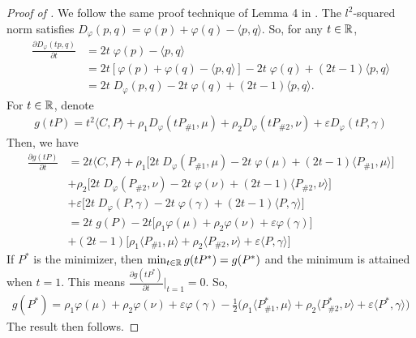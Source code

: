 \begin{proof}[Proof of ]
We follow the same proof technique of Lemma 4 in \citep{Khiem20}. The $l^2$-squared norm satisfies
$D_{\varphi}(p, q) = \varphi(p) + \varphi(q) - \langle p, q \rangle$. So, for any $t \in \mathbb R$,
\begin{align}
  \frac{\partial D_{\varphi}(tp, q)}{\partial t}
  &= 2 t \; \varphi(p) - \langle p, q \rangle \\
  &= 2t \left[ \varphi(p) + \varphi(q) - \langle p, q \rangle \right]
  - 2t \; \varphi(q) + (2t-1) \langle p, q \rangle \\
  &= 2t \; D_{\varphi}(p, q) - 2t \; \varphi(q) + (2t - 1) \langle p, q \rangle.
\end{align}
For $t \in \mathbb R$, denote
\begin{align}
  g(tP) = t^2 \langle C, P \rangle + \rho_1 D_{\varphi}(t P_{\# 1}, \mu) +
  \rho_2 D_{\varphi}(t P_{\# 2}, \nu) + \varepsilon D_{\varphi}(t P, \gamma)
\end{align}
Then, we have
\begin{align}
  \frac{\partial g(tP)}{\partial t} &= 2t \langle C, P \rangle
  + \rho_1 \Big[ 2t \; D_{\varphi}(P_{\# 1}, \mu) - 2t \; \varphi(\mu)
  + (2t - 1) \langle P_{\# 1}, \mu \rangle \Big] \\
  &+ \rho_2 \Big[ 2t \; D_{\varphi}(P_{\# 2}, \nu) - 2t \; \varphi(\nu)
  + (2t - 1) \langle P_{\# 2}, \nu \rangle \Big] \\
  &+ \varepsilon \Big[ 2t \; D_{\varphi}(P, \gamma) - 2t \; \varphi(\gamma)
  + (2t - 1) \langle P, \gamma \rangle \Big] \\
  &= 2t \; g(P) - 2t \Big[ \rho_1 \varphi(\mu)
  + \rho_2 \varphi(\nu) + \varepsilon \varphi(\gamma) \Big] \\
  &+ (2t - 1) \Big[ \rho_1 \langle P_{\# 1}, \mu \rangle
  + \rho_2 \langle P_{\# 2}, \nu \rangle + \varepsilon \langle P, \gamma \rangle \Big]
\end{align}
If $P^*$ is the minimizer, then $\min_{t \in \mathbb R} g(tP^*) = g(P^*)$ and the minimum is attained
when $t=1$. This means $\frac{\partial g(tP^*)}{\partial t} \Big |_{t = 1} = 0$. So,
\begin{align}
  g(P^*) = \rho_1 \varphi(\mu)
  + \rho_2 \varphi(\nu) + \varepsilon \varphi(\gamma)
  - \frac{1}{2} \Big( \rho_1 \langle P^*_{\# 1}, \mu \rangle
  + \rho_2 \langle P^*_{\# 2}, \nu \rangle + \varepsilon \langle P^*, \gamma \rangle \Big)
\end{align}
The result then follows.
\end{proof}

